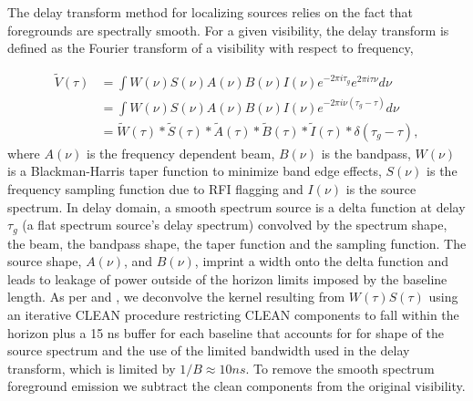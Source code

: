\documentclass[twocolumn,numberedappendix]{emulateapj} \shorttitle{PSA64}
\begin{document}
The delay transform method for localizing sources relies on the fact that
foregrounds are spectrally smooth. For a given visibility, the delay transform
is defined as the Fourier transform of a visibility with respect to frequency, 

\begin{align}\label{eqn:delay_transform}
\tilde{V}(\tau) &= \int{W(\nu)S(\nu)A(\nu)B(\nu)I(\nu)
                   e^{-2\pi{i}\tau_{g}}e^{2\pi{i}\tau\nu}d\nu} \\
                &= \int{W(\nu)S(\nu)A(\nu)B(\nu)I(\nu)
                   e^{-2\pi{i}\nu(\tau_{g}-\tau)}d\nu} \\
                &= \tilde{W}(\tau) \ast\tilde{S}(\tau) \ast \tilde{A}(\tau) \ast
                   \tilde{B}(\tau) \ast \tilde{I}(\tau) \ast
                   \delta(\tau_{g} - \tau),
\end{align}
where $A(\nu)$ is the frequency dependent beam, $B(\nu)$ is the bandpass,
$W(\nu)$ is a Blackman-Harris taper function to minimize band edge effects,
$S(\nu)$ is the frequency sampling function due to RFI flagging  and $I(\nu)$ is
the source spectrum. In delay domain, a smooth spectrum source is a delta
function at delay $\tau_{g}$ (a flat spectrum source's delay spectrum)
convolved by the spectrum shape, the beam, the bandpass shape, the taper
function and the sampling function. The source shape, $A(\nu)$, and $B(\nu)$,
imprint a width onto the delta function and leads to leakage of power outside
of the horizon limits imposed by the baseline length.  As per
\cite{parsons_et_al2010} and \cite{parsons_et_al2014}, we deconvolve the kernel
resulting from $W(\tau)S(\tau)$ using an iterative CLEAN procedure
\citep{hogbom1974} restricting CLEAN components to fall within the horizon plus
a 15 ns buffer for each baseline that accounts for for shape of the source
spectrum and the use of the limited bandwidth used in the delay transform,
which is limited by $1/B \approx 10 ns$. To remove the smooth spectrum
foreground emission we subtract the clean components from the original
visibility.
\end{document}
